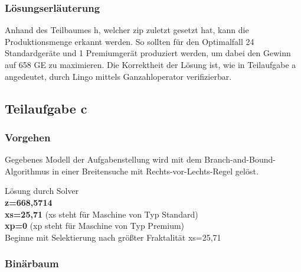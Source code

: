 \documentclass[a4paper,11pt]{article}
\begin{document}
\subsubsection*{Lösungserläuterung}
Anhand des Teilbaumes h, welcher zip zuletzt gesetzt hat, kann die Produktionsmenge erkannt werden. So sollten für den Optimalfall 24 Standardgeräte und 1 Premiumgerät produziert werden, um dabei den Gewinn auf 658 GE zu maximieren. Die Korrektheit der Lösung ist, wie in Teilaufgabe a angedeutet, durch Lingo mittels Ganzahloperator verifizierbar.

\subsection*{Teilaufgabe c}
\subsubsection*{Vorgehen}
Gegebenes Modell der Aufgabenstellung wird mit dem Branch-and-Bound-Algorithmus in einer Breitensuche mit Rechts-vor-Lechts-Regel gelöst.

Lösung durch Solver \\
\textbf{z=668,5714} \\
\textbf{xs=25,71} (xs steht für Maschine von Typ Standard) \\
\textbf{xp=0} (xp steht für Maschine von Typ Premium) \\

Beginne mit Selektierung nach größter Fraktalität xs=25,71

\subsubsection*{Binärbaum}
\end{document}
